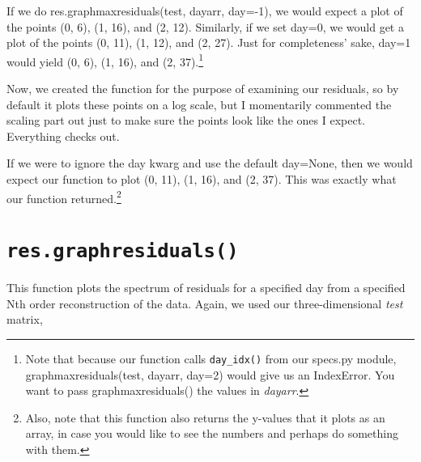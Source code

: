 \documentclass{article}
\begin{document}
If we do res.graphmaxresiduals(test, dayarr, day=-1), we would expect
a plot of the points (0, 6), (1, 16), and (2, 12).  Similarly, if we set
day=0, we would get a plot of the points (0, 11), (1, 12), and (2, 27).
Just for completeness' sake, day=1 would yield (0, 6), (1, 16), and
(2, 37).\footnote{Note that because our function calls \texttt{day\_idx()} from our
specs.py module, graphmaxresiduals(test, dayarr, day=2) would give us
an IndexError.  You want to pass graphmaxresiduals() the values in \emph{dayarr}.}

Now, we created the function for the purpose of examining our
residuals, so by default it plots these points on a log scale, but I
momentarily commented the scaling part out just to make sure the
points look like the ones I expect.  Everything checks out.

If we were to ignore the day kwarg and use the default day=None, then
we would expect our function to plot (0, 11), (1, 16), and (2, 37).
This was exactly what our function returned.\footnote{Also, note that
  this function also returns the y-values that it plots as an array,
  in case you would like to see the numbers and perhaps do something with them.}


\section{\texttt{res.graphresiduals()}}
\label{sec:graphmaxresiduals}

This function plots the spectrum of residuals for a specified day from
a specified Nth order reconstruction of the data.  Again, we used our
three-dimensional \textit{test} matrix,
\end{document}
